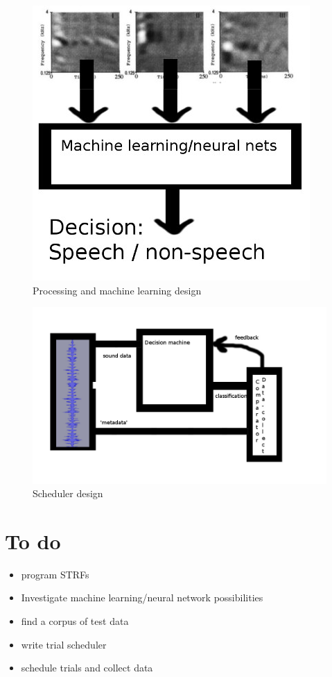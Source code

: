\documentclass{article}
\begin{document}
\begin{figure}
	\includegraphics[width=\linewidth]{diagram1.jpg}
	\caption{Processing and machine learning design}
	\label{fig:dia1}
\end{figure}

\begin{figure}
	\includegraphics[width=\linewidth]{diagram2.jpg}
	\caption{Scheduler design}
	\label{fig:dia2}
\end{figure}

\section{To do}
\begin{itemize}
	\item program STRFs
	\item Investigate machine learning/neural network possibilities
	\item find a corpus of test data
	\item write trial scheduler
	\item schedule trials and collect data
\end{itemize}
\end{document}

